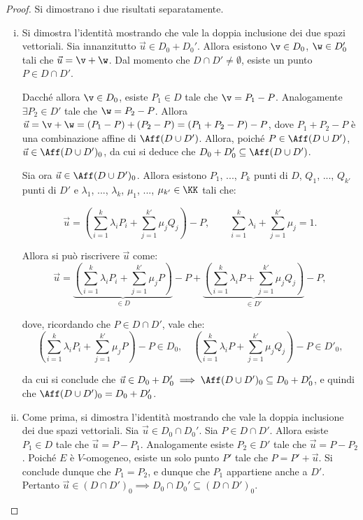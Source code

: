 \documentclass[11pt]{article}
\begin{document}
	\begin{proof}
		Si dimostrano i due risultati separatamente.

		\begin{enumerate}[(i)]
			\item Si dimostra l'identità mostrando che vale la doppia inclusione dei due spazi vettoriali.
			Sia innanzitutto $\vec u \in D_0 + D_0'$. Allora esistono $\v \in D_0$, $\w \in D_0'$ tali che
			$\vec u = \v + \w$. Dal momento che $D \cap D' \neq \emptyset$, esiste un punto $P \in D \cap D'$.
			
			Dacché allora $\v \in D_0$, esiste $P_1 \in D$ tale che $\v = P_1 - P$. Analogamente $\exists P_2 \in D'$
			tale che $\w = P_2 - P$. Allora $\vec u = \v + \w = (P_1 - P) + (P_2 - P) = (P_1 + P_2 - P) - P$,
			dove $P_1 + P_2 - P$ è una combinazione affine di $\Aff(D \cup D')$. Allora, poiché $P \in \Aff(D \cup D')$,
			$\vec u \in \Aff(D \cup D')_0$, da cui si deduce che $D_0 + D_0' \subseteq \Aff(D \cup D')$.
			
			Sia ora $\vec u \in \Aff(D \cup D')_0$. Allora esistono $P_1$, ..., $P_k$ punti di $D$, $Q_1$, ..., $Q_{k'}$
			punti di $D'$ e $\lambda_1$, ..., $\lambda_k$, $\mu_1$, ..., $\mu_{k'} \in \KK$ tali che:
			
			\[ \vec u = \left( \sum_{i=1}^k \lambda_i P_i + \sum_{j=1}^{k'} \mu_j Q_j \right) - P, \qquad \sum_{i=1}^k \lambda_i + \sum_{j=1}^{k'} \mu_j = 1. \]
			
			\vskip 0.05in
			
			Allora si può riscrivere $\vec u$ come:
			\[ \vec u =  \underbrace{\left(\sum_{i=1}^k \lambda_i P_i + \sum_{j=1}^{k'} \mu_j P\right)}_{\in D}  - P +  \underbrace{\left(\sum_{i=1}^k \lambda_i P + \sum_{j=1}^{k'} \mu_j Q_j\right)}_{\in D'} - P, \]
			
			dove, ricordando che $P \in D \cap D'$, vale che:
			\[ \left(\sum_{i=1}^k \lambda_i P_i + \sum_{j=1}^{k'} \mu_j P\right)  - P \in D_0, \quad 
			\left(\sum_{i=1}^k \lambda_i P + \sum_{j=1}^{k'} \mu_j Q_j\right) - P \in D'_0, \]
			
			da cui si conclude che $\vec u \in D_0 + D_0' \implies \Aff(D \cup D')_0 \subseteq D_0 + D'_0$,
			e quindi che $\Aff(D \cup D')_0 = D_0 + D'_0$.
			
			\item Come prima, si dimostra l'identità mostrando che vale la doppia inclusione dei due
			spazi vettoriali. Sia $\vec u \in D_0 \cap D_0'$. Sia $P \in D \cap D'$. Allora esiste $P_1 \in D$
			tale che $\vec u = P - P_1$. Analogamente esiste $P_2 \in D'$ tale che $\vec u = P - P_2$. Poiché
			$E$ è $V$-omogeneo, esiste un solo punto $P'$ tale che $P = P' + \vec u$. Si conclude dunque
			che $P_1 = P_2$, e dunque che $P_1$ appartiene anche a $D'$. Pertanto $\vec u \in (D \cap D')_0 \implies
			D_0 \cap D_0' \subseteq (D \cap D')_0$.
			

\end{enumerate}
\end{proof}
\end{document}
